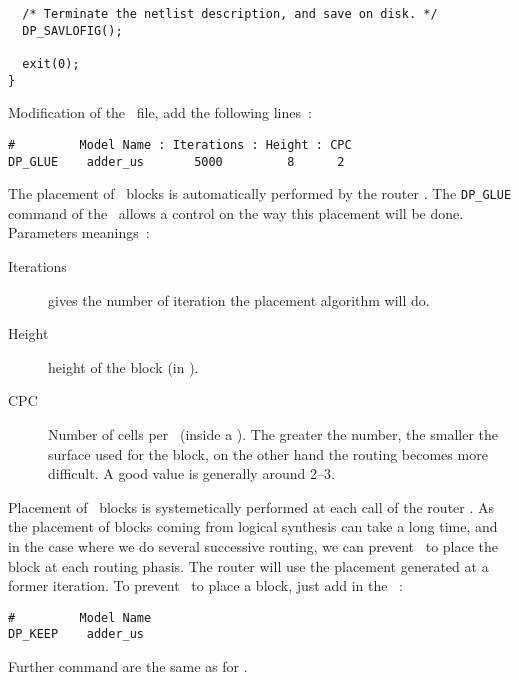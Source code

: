 \begin{description}
{\begin{verbatim}
  /* Terminate the netlist description, and save on disk. */
  DP_SAVLOFIG();

  exit(0);
}
         \end{verbatim} \rm }
         \pagebreak[1]
       \item
         Modification of the \dprfile\ file, add the following lines~:
         { \tt \begin{verbatim}
#         Model Name : Iterations : Height : CPC
DP_GLUE    adder_us       5000         8      2
         \end{verbatim} \rm }
         \forceindent
           The placement of \gluelogic\ blocks is automatically performed by
         the router \dpr. The {\tt DP\_GLUE} command of the \dprfile\
         allows a control on the way this placement will be done.\\
         \forceindent
           Parameters meanings~:
         \begin{description}
           \item[Iterations] gives the number of iteration the placement
             algorithm will do.
           \item[Height] height of the block (in \slices).
           \item[CPC] Number of cells per \slice\ (inside a \column).
             The greater the number, the smaller the surface used for the
           block, on the other hand the routing becomes more difficult.
           A good value is generally around 2--3.
         \end{description}
         \pagebreak[3]
         \forceindent
           Placement of \gluelogic\ blocks is systemetically performed at
         each call of the router \dpr. As the placement of blocks coming
         from logical synthesis can take a long time, and in the case
         where we do several successive routing, we can prevent \dpr\ 
         to place the block at each routing phasis. The router will use
         the placement generated at a former iteration. To prevent
         \dpr\ to place a block, just add in the \dprfile~:
         { \tt \begin{verbatim}
#         Model Name
DP_KEEP    adder_us
         \end{verbatim} \rm }
         \forceindent
           Further command are the same as for \sampledpt.
     \end{description}
